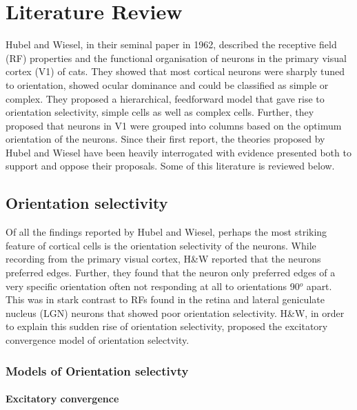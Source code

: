 \chapter{Literature Review}

Hubel and Wiesel, in their seminal paper in 1962, described the receptive field (RF) properties and the functional organisation of neurons in the primary visual cortex (V1) of cats. They showed that most cortical neurons were sharply tuned to orientation, showed ocular dominance and could be classified as simple or complex. They proposed a hierarchical, feedforward model that gave rise to orientation selectivity, simple cells as well as complex cells. Further, they proposed that neurons in V1 were grouped into columns based on the optimum orientation of the neurons. Since their first report, the theories proposed by Hubel and Wiesel have been heavily interrogated with evidence presented both to support and oppose their proposals. Some of this literature is reviewed below.

\section{Orientation selectivity}

Of all the findings reported by Hubel and Wiesel, perhaps the most striking feature of cortical cells is the orientation selectivity of the neurons. While recording from the primary visual cortex, H\&W reported that the neurons preferred edges. Further, they found that the neuron only preferred edges of a very specific orientation often not responding at all to orientations 90$^o$ apart. This was in stark contrast to RFs found in the retina and lateral geniculate nucleus (LGN) neurons that showed poor orientation selectivity. H\&W, in order to explain this sudden rise of orientation selectivity, proposed the excitatory convergence model of orientation selectvity.

\subsection{Models of Orientation selectivty}

\subsubsection{Excitatory convergence}

